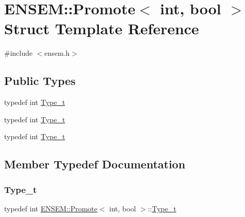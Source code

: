 \hypertarget{structENSEM_1_1Promote_3_01int_00_01bool_01_4}{}\section{E\+N\+S\+EM\+:\+:Promote$<$ int, bool $>$ Struct Template Reference}
\label{structENSEM_1_1Promote_3_01int_00_01bool_01_4}


{\ttfamily \#include $<$ensem.\+h$>$}

\subsection*{Public Types}
\begin{DoxyCompactItemize}
\item 
typedef int \mbox{\hyperlink{structENSEM_1_1Promote_3_01int_00_01bool_01_4_a41a8125f71f49258876367a95577157c}{Type\+\_\+t}}
\item 
typedef int \mbox{\hyperlink{structENSEM_1_1Promote_3_01int_00_01bool_01_4_a41a8125f71f49258876367a95577157c}{Type\+\_\+t}}
\item 
typedef int \mbox{\hyperlink{structENSEM_1_1Promote_3_01int_00_01bool_01_4_a41a8125f71f49258876367a95577157c}{Type\+\_\+t}}
\end{DoxyCompactItemize}


\subsection{Member Typedef Documentation}
\mbox{\label{structENSEM_1_1Promote_3_01int_00_01bool_01_4_a41a8125f71f49258876367a95577157c}} 
\subsubsection{\texorpdfstring{Type\_t}{Type\_t}\hspace{0.1cm}{\footnotesize\ttfamily [1/3]}}
{\footnotesize\ttfamily typedef int \mbox{\hyperlink{structENSEM_1_1Promote}{E\+N\+S\+E\+M\+::\+Promote}}$<$ int, bool $>$\+::\mbox{\hyperlink{structENSEM_1_1Promote_3_01int_00_01bool_01_4_a41a8125f71f49258876367a95577157c}{Type\+\_\+t}}}

\mbox{\label{structENSEM_1_1Promote_3_01int_00_01bool_01_4_a41a8125f71f49258876367a95577157c}} 

